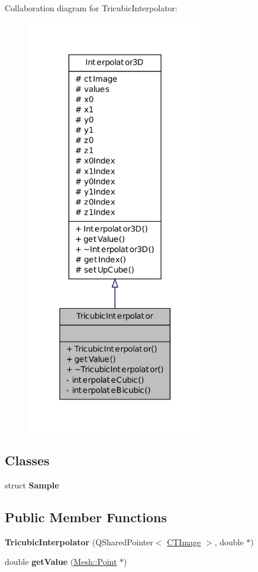 Collaboration diagram for TricubicInterpolator:
\nopagebreak
\begin{figure}[H]
\begin{center}
\leavevmode
\includegraphics[width=220pt]{class_tricubic_interpolator__coll__graph}
\end{center}
\end{figure}
\subsection*{Classes}
\begin{DoxyCompactItemize}
\item 
struct {\bfseries Sample}
\end{DoxyCompactItemize}
\subsection*{Public Member Functions}
\begin{DoxyCompactItemize}
\item 
\hypertarget{class_tricubic_interpolator_a91c45e1632c77d561f55bc1f67690676}{
{\bfseries TricubicInterpolator} (QSharedPointer$<$ \hyperlink{class_c_t_image}{CTImage} $>$, double $\ast$)}
\label{class_tricubic_interpolator_a91c45e1632c77d561f55bc1f67690676}

\item 
\hypertarget{class_tricubic_interpolator_af148fbb61a181d38539eb3feaf6445da}{
double {\bfseries getValue} (\hyperlink{struct_mesh_1_1_point}{Mesh::Point} $\ast$)}
\label{class_tricubic_interpolator_af148fbb61a181d38539eb3feaf6445da}

\end{DoxyCompactItemize}
